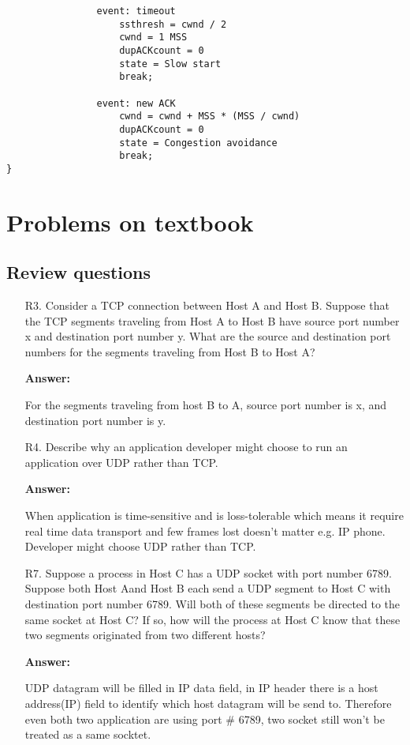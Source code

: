 \begin{enumerate}
\begin{itemize}
\begin{lstlisting}
                event: timeout
                    ssthresh = cwnd / 2
                    cwnd = 1 MSS
                    dupACKcount = 0
                    state = Slow start
                    break;

                event: new ACK
                    cwnd = cwnd + MSS * (MSS / cwnd) 
                    dupACKcount = 0
                    state = Congestion avoidance
                    break;
}

        \end{lstlisting}
    \end{itemize}
    
    
\end{enumerate}

\section{Problems on textbook}
\subsection{Review questions}

\begin{enumerate}
    \item[R3.] Consider a TCP connection between Host A and Host B. Suppose that the TCP segments traveling from Host A to Host B have source port number x and destination port number y. What are the source and destination port numbers for the segments traveling from Host B to Host A?

    \textbf{Answer:}

    For the segments traveling from host B to A, source port number is x, and destination port number is y.
    
    \item[R4.] Describe why an application developer might choose to run an application over UDP rather than TCP.

    \textbf{Answer:}

    When application is time-sensitive and is loss-tolerable which means it require real time data transport and few frames lost doesn't matter e.g. IP phone. Developer might choose UDP rather than TCP.
    
    \item[R7.] Suppose a process in Host C has a UDP socket with port number 6789. Suppose both Host Aand Host B each send a UDP segment to Host C with destination port number 6789. Will both of these segments be directed to the same socket at Host C? If so, how will the process at Host C know that these two segments originated from two different hosts?

    \textbf{Answer:}

    UDP datagram will be filled in IP data field, in IP header there is a host address(IP) field to identify which host datagram will be send to. Therefore even both two application are using port \# 6789, two socket still won't be treated as a same socktet.

\end{enumerate}

